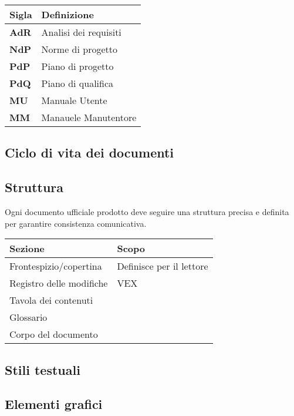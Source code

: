\begin{center}
    \begin{tabularx}{\linewidth}{l | X }            
        \textbf{Sigla} & \textbf{Definizione}\\
        \hline
        \textbf{AdR} & Analisi dei requisiti\\
        \textbf{NdP}& Norme di progetto\\
        \textbf{PdP}& Piano di progetto\\
        \textbf{PdQ}& Piano di qualifica\\
        \textbf{MU}& Manuale Utente\\
        \textbf{MM}& Manauele Manutentore\\
    \end{tabularx}
\end{center}

\subsection{Ciclo di vita dei documenti}

\subsection{Struttura}

Ogni documento ufficiale prodotto deve seguire una struttura precisa e definita per garantire consistenza comunicativa.

\begin{center}
    \begin{tabularx}{\linewidth}{l | X }            
        \textbf{Sezione} & \textbf{Scopo}\\
        \hline
        Frontespizio/copertina & Definisce per il lettore\\
        Registro delle modifiche & VEX\\
        Tavola dei contenuti \\
        Glossario &\\
        Corpo del documento &\\
    \end{tabularx}
\end{center}

\subsection{Stili testuali}
\subsection{Elementi grafici}
